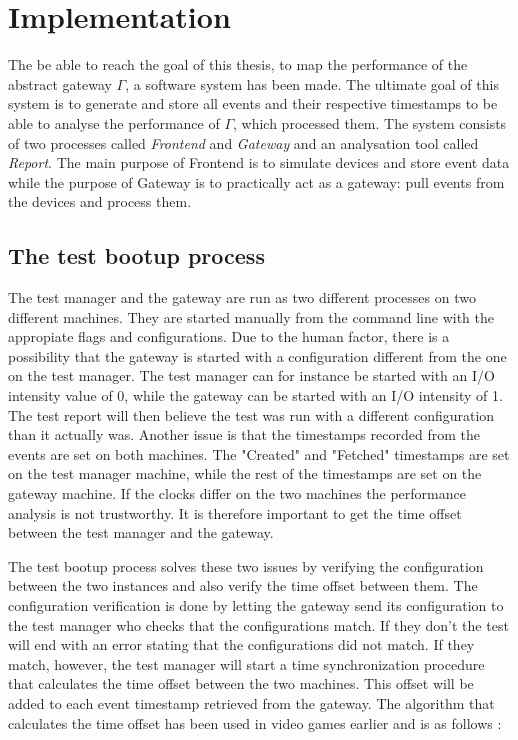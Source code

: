 \chapter{Implementation}

The be able to reach the goal of this thesis, to map the performance of the
abstract gateway $\Gamma$, a software system has been made. The ultimate goal
of this system is to generate and store all events and their respective
timestamps to be able to analyse the performance of $\Gamma$, which processed
them. The system consists of two processes called \textit{Frontend} and
\textit{Gateway} and an analysation tool called \textit{Report}. The main
purpose of Frontend is to simulate devices and store event data while the
purpose of Gateway is to practically act as a gateway: pull events from the
devices and process them.

\section{The test bootup process}

The test manager and the gateway are run as two different processes on two
different machines. They are started manually from the command line with the
appropiate flags and configurations. Due to the human factor, there is a
possibility that the gateway is started with a configuration different from the
one on the test manager. The test manager can for instance be started with an
I/O intensity value of 0, while the gateway can be started with an I/O
intensity of 1. The test report will then believe the test was run with a
different configuration than it actually was. Another issue is that the
timestamps recorded from the events are set on both machines. The "Created" and
"Fetched" timestamps are set on the test manager machine, while the rest of the
timestamps are set on the gateway machine. If the clocks differ on the two
machines the performance analysis is not trustworthy. It is therefore important
to get the time offset between the test manager and the gateway.

The test bootup process solves these two issues by verifying the configuration
between the two instances and also verify the time offset between them. The
configuration verification is done by letting the gateway send its
configuration to the test manager who checks that the configurations match. If
they don't the test will end with an error stating that the configurations did
not match. If they match, however, the test manager will start a time
synchronization procedure that calculates the time offset between the two
machines. This offset will be added to each event timestamp retrieved from the
gateway. The algorithm that calculates the time offset has been used in video
games earlier and is as follows \cite{simpson2004stream}:

